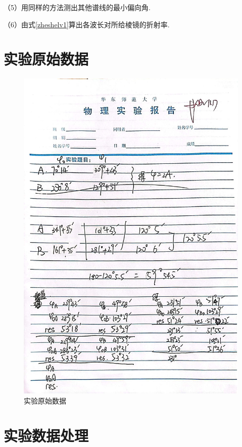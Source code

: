 \documentclass{ctexart}
\begin{document}
    （5）用同样的方法测出其他谱线的最小偏向角.

    （6）由式\ref{zheshelv1}算出各波长对所给棱镜的折射率.
\newpage

\section{实验原始数据}
\begin{figure}[H]
  \centering
  \includegraphics[height=0.8\textheight,width=1\textwidth]{yuanshishujv.jpg}
  \caption{实验原始数据}\label{yuanshishujv}
\end{figure}
\newpage

\section{实验数据处理}
\end{document}
